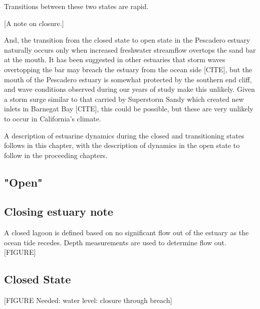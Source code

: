 Transitions between these two states are rapid. 

[A note on closure.] 

And, the transition from the closed state to open state in the Pescadero estuary naturally occurs only when increased freshwater streamflow overtops the sand bar at the mouth. It has been suggested in other estuaries that storm waves overtopping the bar may breach the estuary from the ocean side [CITE], but the mouth of the Pescadero estuary is somewhat protected by the southern end cliff, and wave conditions observed during our years of study make this unlikely. Given a storm surge similar to that carried by Superstorm Sandy which created new inlets in Barnegat Bay [CITE], this could be possible, but these are very unlikely to occur in California's climate. 

A description of estuarine dynamics during the closed and transitioning states follows in this chapter, with the description of dynamics in the open state to follow in the proceeding chapters. 

\subsection{"Open"}
\label{opench2}



\subsection{Closing estuary note}
\label{closingest}
A closed lagoon is defined based on no significant flow out of the estuary as the ocean tide recedes. Depth measurements are used to determine flow out. [FIGURE]

\subsection{Closed State}
\label{closed dynamics}


[FIGURE Needed: water level: closure through breach]

